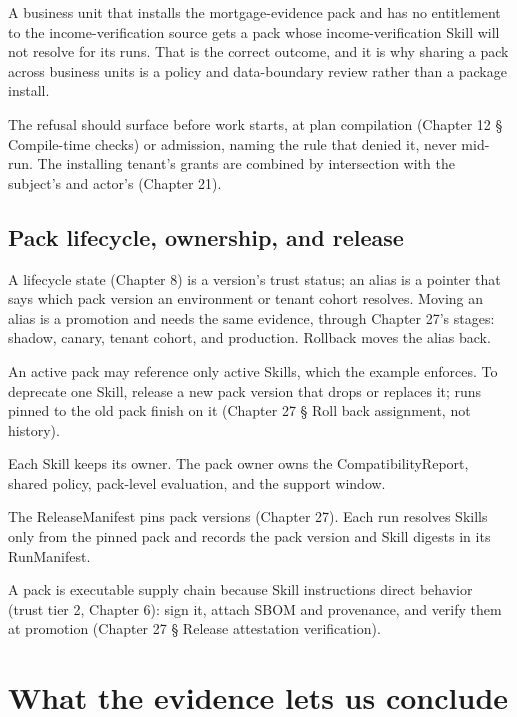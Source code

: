 A business unit that installs the mortgage-evidence pack and has no entitlement to the income-verification source gets a pack whose income-verification Skill will not resolve for its runs. That is the correct outcome, and it is why sharing a pack across business units is a policy and data-boundary review rather than a package install.\par

The refusal should surface before work starts, at plan compilation (Chapter 12 § Compile-time checks) or admission, naming the rule that denied it, never mid-run. The installing tenant's grants are combined by intersection with the subject's and actor's (Chapter 21).\par

\subsection{Pack lifecycle, ownership, and release}

A lifecycle state (Chapter 8) is a version's trust status; an alias is a pointer that says which pack version an environment or tenant cohort resolves. Moving an alias is a promotion and needs the same evidence, through Chapter 27's stages: shadow, canary, tenant cohort, and production. Rollback moves the alias back.\par

An active pack may reference only active Skills, which the example enforces. To deprecate one Skill, release a new pack version that drops or replaces it; runs pinned to the old pack finish on it (Chapter 27 § Roll back assignment, not history).\par

Each Skill keeps its owner. The pack owner owns the CompatibilityReport, shared policy, pack-level evaluation, and the support window.\par

The ReleaseManifest pins pack versions (Chapter 27). Each run resolves Skills only from the pinned pack and records the pack version and Skill digests in its RunManifest.\par

A pack is executable supply chain because Skill instructions direct behavior (trust tier 2, Chapter 6): sign it, attach SBOM and provenance, and verify them at promotion (Chapter 27 § Release attestation verification).\par

\section{What the evidence lets us conclude}

